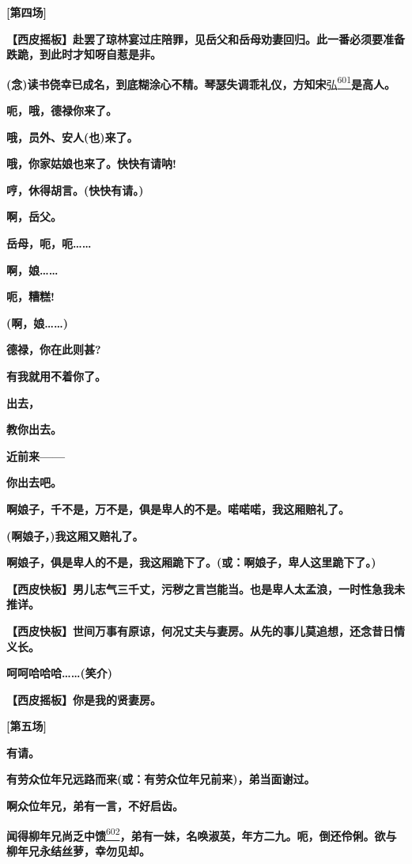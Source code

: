 \textbf{{[}第四场{]}}

\textbf{【西皮摇板】赴罢了琼林宴过庄陪罪，见岳父和岳母劝妻回归。此一番必须要准备跌跪，到此时才知呀自惹是非。}

\textbf{(念)读书侥幸已成名，到底糊涂心不精。琴瑟失调乖礼仪，方知宋}弘\protect\hyperlink{fn601}{\textsuperscript{601}}\textbf{是高人。}

\textbf{呃，哦，德禄你来了。}

\textbf{哦，员外、安人(也)来了。}

\textbf{哦，你家姑娘也来了。快快有请呐!}

\textbf{哼，休得胡言。(快快有请。)}

\textbf{啊，岳父。}

\textbf{岳母，呃，呃\ldots{}\ldots{}}

\textbf{啊，娘\ldots{}\ldots{}}

\textbf{呃，糟糕!}

\textbf{(啊，娘\ldots{}\ldots{})}

\textbf{德禄，你在此则甚?}

\textbf{有我就用不着你了。}

\textbf{出去，}

\textbf{教你出去。}

\textbf{近前来------}

\textbf{你出去吧。}

\textbf{啊娘子，千不是，万不是，俱是卑人的不是。喏喏喏，我这厢赔礼了。}

\textbf{(啊娘子，)我这厢又赔礼了。}

\textbf{啊娘子，俱是卑人的不是，我这厢跪下了。(或：啊娘子，卑人这里跪下了。)}

\textbf{【西皮快板】男儿志气三千丈，污秽之言岂能当。也是卑人太孟浪，一时性急我未推详。}

\textbf{【西皮快板】世间万事有原谅，何况丈夫与妻房。从先的事儿莫追想，还念昔日情义长。}

\textbf{呵呵哈哈哈\ldots{}\ldots{}(笑介)}

\textbf{【西皮摇板】你是我的贤妻房。}

\textbf{{[}第五场{]}}

\textbf{有请。}

\textbf{有劳众位年兄远路而来(或：有劳众位年兄前来)，弟当面谢过。}

\textbf{啊众位年兄，弟有一言，不好启齿。}

\textbf{闻得柳年兄尚乏中馈}\protect\hyperlink{fn602}{\textsuperscript{602}}\textbf{，弟有一妹，名唤淑英，年方二九。呃，倒还伶俐。欲与柳年兄永结丝萝，幸勿见却。}

